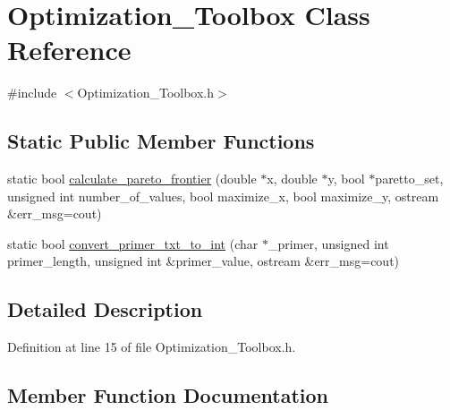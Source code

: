 \hypertarget{class_optimization___toolbox}{}\section{Optimization\+\_\+\+Toolbox Class Reference}
\label{class_optimization___toolbox}


{\ttfamily \#include $<$Optimization\+\_\+\+Toolbox.\+h$>$}

\subsection*{Static Public Member Functions}
\begin{DoxyCompactItemize}
\item 
static bool \mbox{\hyperlink{class_optimization___toolbox_acb0793203243d200d9154f2e98011d44}{calculate\+\_\+pareto\+\_\+frontier}} (double $\ast$x, double $\ast$y, bool $\ast$paretto\+\_\+set, unsigned int number\+\_\+of\+\_\+values, bool maximize\+\_\+x, bool maximize\+\_\+y, ostream \&err\+\_\+msg=cout)
\item 
static bool \mbox{\hyperlink{class_optimization___toolbox_a44f2c18904985dd9591efe0a63bfae9b}{convert\+\_\+primer\+\_\+txt\+\_\+to\+\_\+int}} (char $\ast$\+\_\+primer, unsigned int primer\+\_\+length, unsigned int \&primer\+\_\+value, ostream \&err\+\_\+msg=cout)
\end{DoxyCompactItemize}


\subsection{Detailed Description}


Definition at line 15 of file Optimization\+\_\+\+Toolbox.\+h.



\subsection{Member Function Documentation}
\mbox{\label{class_optimization___toolbox_acb0793203243d200d9154f2e98011d44}} 
